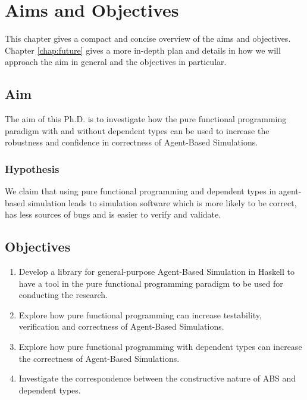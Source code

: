 \chapter{Aims and Objectives}
\label{chap:aimsObj}

This chapter gives a compact and concise overview of the aims and objectives. Chapter \ref{chap:future} gives a more in-depth plan and details in how we will approach the aim in general and the objectives in particular.

\section{Aim}
The aim of this Ph.D. is to investigate how the pure functional programming paradigm with and without dependent types can be used to increase the robustness and confidence in correctness of Agent-Based Simulations.

\subsection{Hypothesis}
We claim that using pure functional programming and dependent types in agent-based simulation leads to simulation software which is more likely to be correct, has less sources of bugs and is easier to verify and validate.

\section{Objectives}
\begin{enumerate}
	\item Develop a library for general-purpose Agent-Based Simulation in Haskell to have a tool in the pure functional programming paradigm to be used for conducting the research.


	\item Explore how pure functional programming can increase testability, verification and correctness of Agent-Based Simulations.

	\item Explore how pure functional programming with dependent types can increase the correctness of Agent-Based Simulations.

	
	\item Investigate the correspondence between the constructive nature of ABS and dependent types.
\end{enumerate}